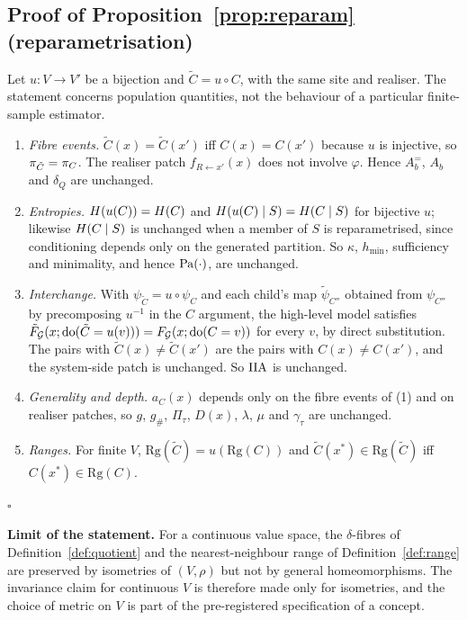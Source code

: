 \subsection{Proof of Proposition~\ref{prop:reparam} (reparametrisation)}
\label{proof:P4}
Let $u\colon V\to V'$ be a bijection and $\tilde C=u\circ C$, with the same
site and realiser. The statement concerns population quantities, not the
behaviour of a particular finite-sample estimator.
\begin{enumerate}[label=(\arabic*)]
\item \emph{Fibre events.} $\tilde C(x)=\tilde C(x')$ iff $C(x)=C(x')$
because $u$ is injective, so $\pi_{\tilde C}=\pi_C$. The realiser patch
$f_{R\leftarrow x'}(x)$ does not involve $\varphi$. Hence $A_b^{=}$, $A_b$
and $\delta_Q$ are unchanged.
\item \emph{Entropies.} $H(u(C))=H(C)$ and
$H(u(C)\mid S)=H(C\mid S)$ for bijective $u$; likewise
$H(C\mid S)$ is unchanged when a member of $S$ is reparametrised, since
conditioning depends only on the generated partition. So $\kappa$,
$h_{\min}$, sufficiency and minimality, and hence $\mathrm{Pa}(\cdot)$, are unchanged.
\item \emph{Interchange.} With $\psi_{\tilde C}=u\circ\psi_C$ and each child's
map $\tilde\psi_{C''}$ obtained from $\psi_{C''}$ by precomposing $u^{-1}$ in
the $C$ argument, the high-level model satisfies
$\tilde F_{\mathcal{G}}(x;\mathrm{do}(\tilde C=u(v)))=F_{\mathcal{G}}(x;\mathrm{do}(C=v))$ for
every $v$, by direct substitution. The pairs with $\tilde C(x)\ne\tilde C(x')$
are the pairs with $C(x)\ne C(x')$, and the system-side patch is unchanged.
So $\mathrm{IIA}$ is unchanged.
\item \emph{Generality and depth.} $a_C(x)$ depends only on the fibre events
of (1) and on realiser patches, so $g$, $g_\#$, $\Pi_\tau$, $D(x)$,
$\lambda$, $\mu$ and $\gamma_\tau$ are unchanged.
\item \emph{Ranges.} For finite $V$, $\mathrm{Rg}(\tilde C)=u(\mathrm{Rg}(C))$
and $\tilde C(x^\ast)\in\mathrm{Rg}(\tilde C)$ iff $C(x^\ast)\in\mathrm{Rg}(C)$.
\end{enumerate}
\hfill$\square$

\textbf{Limit of the statement.} For a continuous value space, the
$\delta$-fibres of Definition~\ref{def:quotient} and the nearest-neighbour range of
Definition~\ref{def:range} are preserved by isometries of $(V,\rho)$ but not by general
homeomorphisms. The invariance claim for continuous $V$ is therefore made
only for isometries, and the choice of metric on $V$ is part of the
pre-registered specification of a concept.
